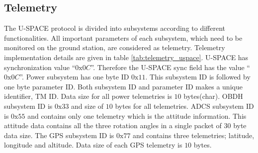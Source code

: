 \subsection{Telemetry}
\label{Number_of_telemetries}
The \ac{U-SPACE} protocol is divided into subsystems according to different functionalities. All important parameters of each subsystem, which need to be monitored on the ground station, are considered as telemetry. Telemetry implementation details are given in table \ref{tab:telemetry_uspace}. \ac{U-SPACE} has synchronization value ``$0\text{x}0C$''. Therefore the \ac{U-SPACE} sync field has the value ``$0\text{x}0C$''. Power subsystem has one byte ID $0\text{x}11$. This subsystem ID is followed by one byte parameter ID. Both subsystem ID and parameter ID makes a unique identifier, TM ID. Data size for all power telemetries is $10$ bytes(char). \ac{OBDH} subsystem ID is $ 0\text{x}33 $ and size of $10$ bytes for all telemetries. \ac{ADCS} subsystem ID is $0\text{x}55$ and contains only one telemetry which is the attitude information. This attitude data contains all the three rotation angles in a single packet of $30$ byte data size. The GPS subsystem ID is $ 0\text{x}77 $ and contains three telemetries; latitude, longitude and altitude. Data size of each GPS telemetry is $10$ bytes.

